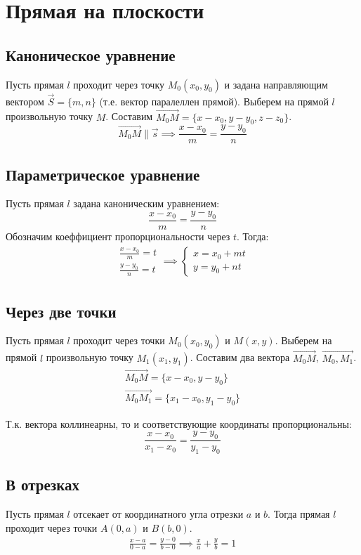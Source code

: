 \section{Прямая на плоскости}

\subsection{Каноническое уравнение}

Пусть прямая $l$ проходит через точку $M_0(x_0, y_0)$ и задана направляющим вектором $\vec{S} = \{m, n\}$ (т.е. вектор паралеллен прямой). Выберем на прямой $l$ произвольную точку $M$.
Составим $\overrightarrow{M_0M} = \{x - x_0, y - y_0, z - z_0\}$. 
\[
  \overrightarrow{M_0M} \parallel \vec{s} \implies \boxed{\frac{x - x_0}{m} = \frac{y - y_0}{n}}
\]

\subsection{Параметрическое уравнение}

Пусть прямая $l$ задана каноническим уравнением: \[
\frac{x - x_0}{m} = \frac{y - y_0}{n}
\] 
Обозначим коеффициент пропорциональности через $t$. Тогда:
\begin{gather*}
  \begin{matrix}
    \frac{x - x_0}{m} = t \\
    \frac{y - y_0}{n} = t
  \end{matrix} \implies \boxed{\begin{cases}
    x = x_0 + mt \\
    y = y_0 + nt
  \end{cases}}
\end{gather*}
 
\subsection{Через две точки}

Пусть прямая $l$ проходит через точки $M_0(x_0, y_0)$ и $M(x, y)$. Выберем на прямой $l$ произвольную точку $M_1(x_1, y_1)$. Составим два вектора $\overrightarrow{M_0M}$, $\overrightarrow{M_0, M_1}$.
\begin{gather*}
  \overrightarrow{M_0M} = \{x - x_0, y - y_0\} \\
  \overrightarrow{M_0M_1} = \{x_1 - x_0, y_1 - y_0\}
\end{gather*}

Т.к. вектора коллинеарны, то и соответствующие координаты пропорциональны:
 \[
  \boxed{\frac{x - x_0}{x_1 - x_0} = \frac{y - y_0}{y_1 - y_0}}
\]

\subsection{В отрезках}

Пусть прямая $l$ отсекает от координатного угла отрезки $a$ и $b$. Тогда прямая $l$ проходит через точки $A(0, a)$ и  $B(b, 0)$.
\begin{gather*}
  \frac{x - a}{0 - a} = \frac{y - 0}{b - 0} \implies \boxed{\frac{x}{a} + \frac{y}{b} = 1}
\end{gather*}


